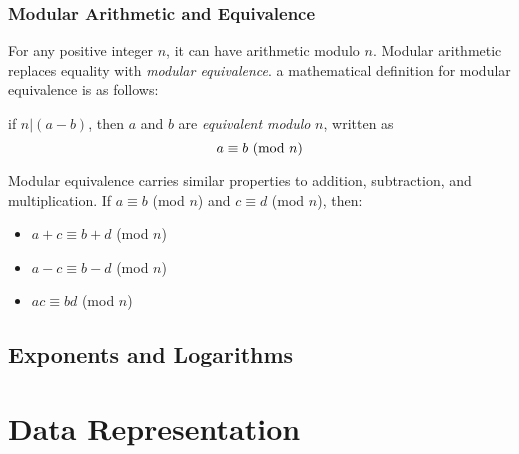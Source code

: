 \documentclass{article}
\begin{document}
\subsubsection{Modular Arithmetic and Equivalence}
For any positive integer \(n\), it can have arithmetic modulo \(n\).
Modular arithmetic replaces equality with \emph{modular equivalence}.
a mathematical definition for modular equivalence is as follows:
\begin{tcolorbox}
    \begin{center}
        if \(n \vert (a - b)\), 
        then \(a\) and \(b\) are \emph{equivalent modulo} \(n\),
        written as
        \[a \equiv b \textnormal{ (mod } n \textnormal{)}\] %
    \end{center}
\end{tcolorbox} 
Modular equivalence carries similar properties to addition, subtraction, and multiplication.
If $a \equiv b$ (mod $n$) and $c \equiv d$ (mod $n$), then:
\begin{itemize}
    \item $a + c \equiv b + d$ (mod $n$)
    \item $a - c \equiv b - d$ (mod $n$)
    \item $ac \equiv bd$ (mod $n$)
\end{itemize}

\subsection{Exponents and Logarithms}

\section{Data Representation}
\end{document}
